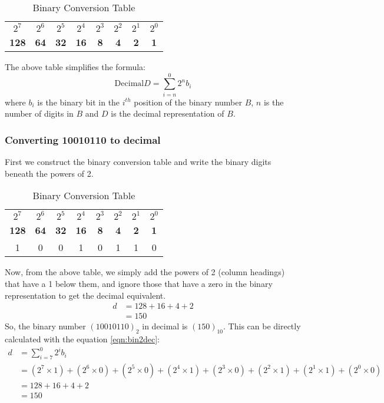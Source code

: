\begin{table}[H]
	\centering
	\begin{tabular}{cccccccc}
		\toprule
		$2^7$ &$2^6$ &$2^5$ &$2^4$ &$2^3$ &$2^2$ &$2^1$ &$2^0$ \\
		\textbf{128} &\textbf{64} &\textbf{32} &\textbf{16} &\textbf{8} &\textbf{4} &\textbf{2} &\textbf{1} \\
		\bottomrule
	\end{tabular}
	\vspace{-5pt}
	\caption{Binary Conversion Table}
\end{table}
\vspace{-10pt}

\noindent
The above table simplifies the formula: 
\begin{equation}
	\text{Decimal} D = \sum_{i=n}^{0} 2^n b_i 
	\label{eqn:bin2dec}
\end{equation}
\noindent where $b_i$ is the binary bit in the $i^{th}$ position of the binary number $B$, $n$ is the number of digits in $B$ and $D$ is the decimal representation of $B$. 

\subsubsection{Converting 10010110 to decimal}
First we construct the binary conversion table and write the binary digits beneath the powers of 2. 

\begin{table}[H]
	\centering
	\begin{tabular}{cccccccc}
		\toprule
		$2^7$ &$2^6$ &$2^5$ &$2^4$ &$2^3$ &$2^2$ &$2^1$ &$2^0$ \\
		\textbf{128} &\textbf{64} &\textbf{32} &\textbf{16} &\textbf{8} &\textbf{4} &\textbf{2} &\textbf{1} \\
		\midrule
		1 &0 &0 &1 &0 &1 &1 &0 \\
		\bottomrule
	\end{tabular}
	\vspace{-5pt}
	\caption{Binary Conversion Table}
\end{table}
\vspace{-10pt}

\noindent
Now, from the above table, we simply add the powers of 2 (column headings) that have a 1 below them, and ignore those that have a zero in the binary representation to get the decimal equivalent.
\begin{align*}
	d &= 128 + 16 + 4 + 2\\
	  &= 150
\end{align*}
So, the binary number $(10010110)_2$ in decimal is $(150)_{10}$. This can be directly calculated with the equation \ref{eqn:bin2dec}: 
\begin{align*}
	d &= \sum_{i=7}^{0} 2^i b_i \\
	&= (2^7\times1) + (2^6\times0) + (2^5\times0) + (2^4\times1) + (2^3\times0) + (2^2\times1) +( 2^1\times1) + (2^0\times0) \\
	&= 128 + 16 + 4 + 2\\
	&= 150
\end{align*}


